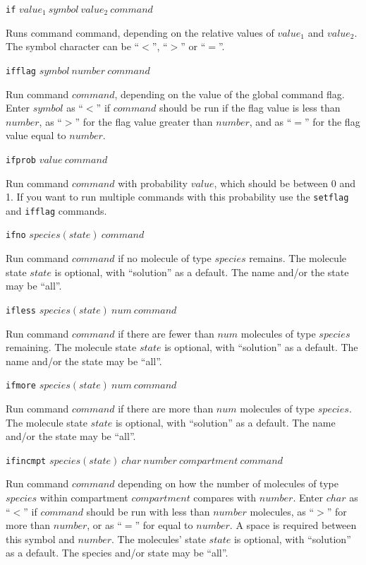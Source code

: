 \documentclass {scrbook}
\newcommand {\ttt} {\texttt}
\begin{document}
\begin{description}

\item{\ttt{if} $value_1\ symbol\ value_2\ command$}

Runs command command, depending on the relative values of $value_1$ and $value_2$. The symbol character can be ``$<$'', ``$>$'' or ``$=$''.

\item{\ttt{ifflag} $symbol\ number\ command$}

Run command $command$, depending on the value of the global command flag. Enter $symbol$ as ``$<$'' if $command$ should be run if the flag value is less than $number$, as ``$>$'' for the flag value greater than $number$, and as ``$=$'' for the flag value equal to $number$.

\item{\ttt{ifprob} $value\ command$}

Run command $command$ with probability $value$, which should be between 0 and 1. If you want to run multiple commands with this probability use the \ttt{setflag} and \ttt{ifflag} commands.

\item{\ttt{ifno} $species(state)\ command$}

Run command $command$ if no molecule of type $species$ remains. The molecule state $state$ is optional, with ``solution'' as a default. The name and/or the state may be ``all''.

\item{\ttt{ifless} $species(state)\ num\ command$}

Run command $command$ if there are fewer than $num$ molecules of type $species$ remaining. The molecule state $state$ is optional, with ``solution'' as a default. The name and/or the state may be ``all''.

\item{\ttt{ifmore} $species(state)\ num\ command$}

Run command $command$ if there are more than $num$ molecules of type $species$. The molecule state $state$ is optional, with ``solution'' as a default. The name and/or the state may be ``all''.

\item{\ttt{ifincmpt} $species(state)\ char\ number\ compartment\ command$}

Run command $command$ depending on how the number of molecules of type $species$ within compartment $compartment$ compares with $number$. Enter $char$ as ``$<$'' if $command$ should be run with less than $number$ molecules, as ``$>$'' for more than $number$, or as ``$=$'' for equal to $number$. A space is required between this symbol and $number$. The molecules' state $state$ is optional, with ``solution'' as a default. The species and/or state may be ``all''.


\end{description}
\end{document}

